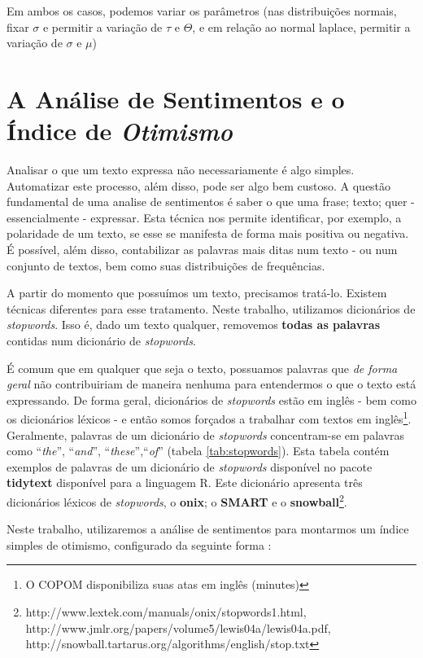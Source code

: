 Em ambos os casos, podemos variar os parâmetros (nas distribuições normais, fixar $\sigma$ e permitir a variação de $\tau$ e $\Theta$, e em relação ao normal laplace, permitir a variação de $\sigma$ e $\mu$)

\section{A Análise de Sentimentos e o Índice de \textit{Otimismo}}

Analisar o que um texto expressa não necessariamente é algo simples. Automatizar este processo, além disso, pode ser algo bem custoso. A questão fundamental de uma analise de sentimentos é saber o que uma frase; texto; quer - essencialmente - expressar. Esta técnica nos permite identificar, por exemplo, a polaridade de um texto, se esse se manifesta de forma mais positiva ou negativa. É possível, além disso, contabilizar as palavras mais ditas num texto - ou num conjunto de textos, bem como suas distribuições de frequências. 

A partir do momento que possuímos um texto, precisamos tratá-lo. Existem técnicas diferentes para esse tratamento. Neste trabalho, utilizamos dicionários de \textit{stopwords}. Isso é, dado um texto qualquer, removemos \textbf{todas as palavras} contidas num dicionário de \textit{stopwords}. 

É comum que em qualquer que seja o texto, possuamos palavras que \textit{de forma geral} não contribuiriam de maneira nenhuma para entendermos o que o texto está expressando. De forma geral, dicionários de \textit{stopwords} estão em inglês - bem como os dicionários léxicos - e então somos forçados a trabalhar com textos em inglês\footnote{O COPOM disponibiliza suas atas em inglês (minutes)}. Geralmente, palavras de um dicionário de \textit{stopwords} concentram-se em palavras como ``\textit{the}'', ``\textit{and}'', ``\textit{these}'',``\textit{of}'' (tabela \ref{tab:stopwords}). Esta tabela contém exemplos de palavras de um dicionário de \textit{stopwords} disponível no pacote \textbf{tidytext} \cite{tidystop} disponível para a linguagem R. Este dicionário apresenta três dicionários léxicos de \textit{stopwords}, o \textbf{onix}; o \textbf{SMART} e o \textbf{snowball}\footnote{http://www.lextek.com/manuals/onix/stopwords1.html, http://www.jmlr.org/papers/volume5/lewis04a/lewis04a.pdf, http://snowball.tartarus.org/algorithms/english/stop.txt}. 

Neste trabalho, utilizaremos a análise de sentimentos para montarmos um índice simples de otimismo, configurado da seguinte forma \cite{costa2016ensaios}:

